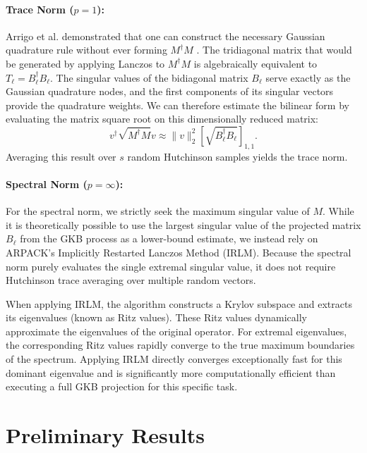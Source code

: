\documentclass[a4paper,11pt]{article}
\begin{document}
\paragraph{Trace Norm ($p=1$):}
Arrigo et al. demonstrated that one can construct the necessary Gaussian quadrature rule without ever forming $M^\dagger M$ \cite{arrigo2016computation}. The tridiagonal matrix that would be generated by applying Lanczos to $M^\dagger M$ is algebraically equivalent to $T_\ell = B_\ell^\dagger B_\ell$. The singular values of the bidiagonal matrix $B_\ell$ serve exactly as the Gaussian quadrature nodes, and the first components of its singular vectors provide the quadrature weights. We can therefore estimate the bilinear form by evaluating the matrix square root on this dimensionally reduced matrix:
\begin{equation}
  v^\dagger \sqrt{M^\dagger M} v \approx \|v\|_2^2 \left[ \sqrt{B_\ell^\dagger B_\ell} \right]_{1,1}.
\end{equation}
Averaging this result over $s$ random Hutchinson samples yields the trace norm.

\paragraph{Spectral Norm ($p=\infty$):}
For the spectral norm, we strictly seek the maximum singular value of $M$. While it is theoretically possible to use the largest singular value of the projected matrix $B_\ell$ from the GKB process as a lower-bound estimate, we instead rely on ARPACK's Implicitly Restarted Lanczos Method (IRLM). Because the spectral norm purely evaluates the single extremal singular value, it does not require Hutchinson trace averaging over multiple random vectors.

When applying IRLM, the algorithm constructs a Krylov subspace and extracts its eigenvalues (known as Ritz values). These Ritz values dynamically approximate the eigenvalues of the original operator. For extremal eigenvalues, the corresponding Ritz values rapidly converge to the true maximum boundaries of the spectrum. Applying IRLM directly converges exceptionally fast for this dominant eigenvalue and is significantly more computationally efficient than executing a full GKB projection for this specific task.

\section{Preliminary Results}
\end{document}
